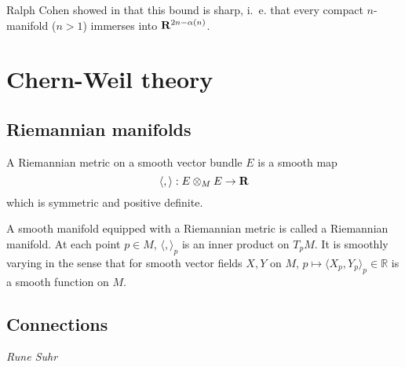 \documentclass[a4paper,openany]{scrbook}
\newcommand{\chapterauthor}[1]{\hfill\emph{#1}\par\noindent}
\begin{document}
\begin{remark}
Ralph Cohen showed in \cite{cohen:immersion-conjecture} that this bound is sharp, i.~e. that every compact $n$-manifold ($n>1$) immerses into $\mathbf R^{2n-\alpha(n)}$. 
\end{remark}

\chapter{Chern-Weil theory}
%
%




\section{Riemannian manifolds}


\begin{defn}  
A Riemannian metric on a smooth vector bundle $E$ is a smooth map
\[
\langle,\rangle : E \otimes_M E \to \mathbf R
\]
which is symmetric and positive definite.
\end{defn}

A smooth manifold equipped with a Riemannian metric is called a Riemannian manifold. At each point $p \in M$, $\langle,\rangle_p$ is an inner product on $T_pM$. It is smoothly varying in the sense that for smooth vector fields $X,Y$ on $M$, $p \mapsto \langle X_p,Y_p\rangle_p \in \mathbb{R}$ is a smooth function on $M$.

\section{Connections} \label{section-connections}
\chapterauthor{Rune Suhr}
\end{document}
